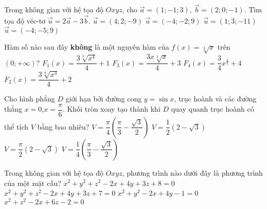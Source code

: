 \begin{ex}%
Trong không gian với hệ tọa độ $Oxyz$, cho $\vec{a}=(1;-1;3)$, $\vec{b}=(2;0;-1)$. Tìm tọa độ véc-tơ $\vec{u}=2\vec{a}-3\vec{b}$.
\choice
{$\vec{u}=(4;2;-9)$}
{\True $\vec{u}=(-4;-2;9)$}
{$\vec{u}=(1;3;-11)$}
{$\vec{u}=(-4;-5;9)$}
\end{ex}
\begin{ex}%
Hàm số nào sau đây {\bf không} là một nguyên hàm của $f(x)=\sqrt[3]{x}$ trên $(0;+\infty)$?
\choice
{$F_1(x) = \dfrac{3\sqrt[3]{x^4}}{4}+1$}
{$F_3(x) = \dfrac{3x\sqrt[3]{x}}{4}+3$}
{$F_4(x) = \dfrac{3}{4}x^{\frac{4}{3}}+4$}
{\True $F_2(x) = \dfrac{3\sqrt[4]{x^3}}{4}+2$}
\end{ex}
\begin{ex}%
Cho hình phẳng $D$ giới hạn bởi đường cong $y=\sin x$, trục hoành và các đường thẳng $x=0$,$x=\dfrac{\pi}{6}$. Khối tròn xoay tạo thành khi $D$ quay quanh trục hoành có thể tích $V$ bằng bao nhiêu?
\choice
{\True $V=\dfrac{\pi}{4}\left(\dfrac{\pi}{3}-\dfrac{\sqrt{3}}{2}\right)$}
{$V=\dfrac{1}{2}\left(2-\sqrt{3}\right)$}
{$V=\dfrac{\pi}{2}\left(2-\sqrt{3}\right)$}
{$V=\dfrac{1}{4}\left(\dfrac{\pi}{3}-\dfrac{\sqrt{3}}{2}\right)$}
\end{ex}
\begin{ex}%
Trong không gian với hệ tọa độ $Oxyz$, phương trình nào dưới đây là phương trình của một mặt cầu?
\choice
{$x^2 + y^2 + z^2 - 2x + 4y + 3z + 8 = 0$}
{\True $x^2 + y^2 + z^2 - 2x + 4y + 3z + 7 = 0$}
{$x^2 + y^2  - 2x + 4y - 1 = 0$}
{$x^2 + z^2 - 2x + 6z -2 = 0$}
\end{ex}
